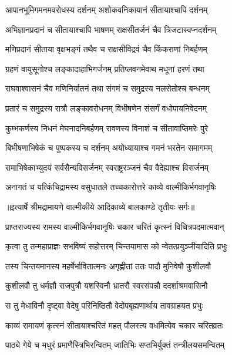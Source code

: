 \twolineshloka
{आपानभूमिगमनमवरोधस्य दर्शनम्}
{अशोकवनिकायानं सीतायाश्चापि दर्शनम्} %

\twolineshloka
{अभिज्ञानप्रदानं च सीतायाश्चापि भाषणम्}
{राक्षसीतर्जनं चैव त्रिजटास्वप्नदर्शनम्} %

\twolineshloka
{मणिप्रदानं सीताया वृक्षभङ्गं तथैव च}
{राक्षसीविद्रवं चैव किंकराणां निबर्हणम्} %

\twolineshloka
{ग्रहणं वायुसूनोश्च लङ्कादाहाभिगर्जनम्}
{प्रतिप्लवनमेवाथ मधूनां हरणं तथा} %

\twolineshloka
{राघवाश्वासनं चैव मणिनिर्यातनं तथा}
{संगमं च समुद्रस्य नलसेतोश्च बन्धनम्} %

\twolineshloka
{प्रतारं च समुद्रस्य रात्रौ लङ्कावरोधनम्}
{विभीषणेन संसर्गं वधोपायनिवेदनम्} %

\twolineshloka
{कुम्भकर्णस्य निधनं मेघनादनिबर्हणम्}
{रावणस्य विनाशं च सीतावाप्तिमरेः पुरे} %

\twolineshloka
{बिभीषणाभिषेकं च पुष्पकस्य च दर्शनम्}
{अयोध्यायाश्च गमनं भरतेन समागमम्} %

\twolineshloka
{रामाभिषेकाभ्युदयं सर्वसैन्यविसर्जनम्}
{स्वराष्ट्ररञ्जनं चैव वैदेह्याश्च विसर्जनम्} %

\twolineshloka
{अनागतं च यत्किंचिद्रामस्य वसुधातले}
{तच्चकारोत्तरे काव्ये वाल्मीकिर्भगवानृषिः} %


{॥इत्यार्षे श्रीमद्रामायणे वाल्मीकीये आदिकाव्ये बालकाण्डे तृतीयः सर्गः॥}


\twolineshloka
{प्राप्तराज्यस्य रामस्य वाल्मीकिर्भगवानृषिः}
{चकार चरितं कृत्स्नं विचित्रपदमात्मवान्} %

\twolineshloka
{कृत्वा तु तन्महाप्राज्ञः सभविष्यं सहोत्तरम्}
{चिन्तयामास को न्वेतत्प्रयुञ्जीयादिति प्रभुः} %

\twolineshloka
{तस्य चिन्तयमानस्य महर्षेर्भावितात्मनः}
{अगृह्णीतां ततः पादौ मुनिवेषौ कुशीलवौ} %

\twolineshloka
{कुशीलवौ तु धर्मज्ञौ राजपुत्रौ यशस्विनौ}
{भ्रातरौ स्वरसंपन्नौ ददर्शाश्रमवासिनौ} %

\twolineshloka
{स तु मेधाविनौ दृष्ट्वा वेदेषु परिनिष्ठितौ}
{वेदोपबृह्मणार्थाय तावग्राहयत प्रभुः} %

\twolineshloka
{काव्यं रामायणं कृत्स्नं सीतायाश्चरितं महत्}
{पौलस्त्य वधमित्येव चकार चरितव्रतः} %

\twolineshloka
{पाठ्ये गेये च मधुरं प्रमाणैस्त्रिभिरन्वितम्}
{जातिभिः सप्तभिर्युक्तं तन्त्रीलयसमन्वितम्} %

